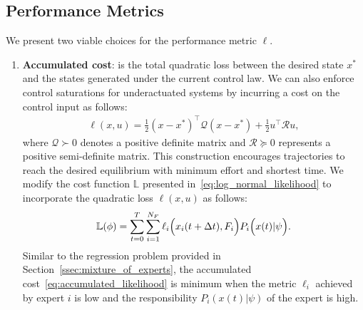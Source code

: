 \subsection{Performance Metrics}
\label{ssec:performance_objective}
%
We present two viable choices for the performance metric $\ell$. 
\begin{enumerate}
    \item \textbf{Accumulated cost}: is the total quadratic loss between the
    desired state $x^*$ and the states generated under the current control law.
    We can also enforce control saturations for underactuated systems by incurring a
    cost on the control input as follows:
    \begin{equation}
        \begin{gathered}
            \ell(x, u) = \frac{1}{2}(x - x^*)^\top \mathcal{Q} (x - x^*) + \frac{1}{2} u^\top \mathcal{R} u , 
        \end{gathered}
    \label{eq:accumulatedLoss}
    \end{equation}
    \noindent where $\mathcal{Q} \succ 0$ denotes a positive definite matrix and
    $\mathcal{R} \succeq 0$ represents a positive semi-definite matrix.
    This construction encourages trajectories to reach the desired equilibrium
    with minimum effort and shortest time.
    We modify the cost function $\mathbb{L}$ presented
    in~\eqref{eq:log_normal_likelihood} to incorporate the quadratic loss
    $\ell(x, u)$ as follows:
    \begin{align}
        \mathbb{L}(\phi) = \sum_{t=0}^{T} \sum_{i=1}^{N_F} \ell_i \Bigl(x_i(t+\Delta t), F_i \Bigr) P_i\Bigl(x(t) | \psi \Bigr)  .
        \label{eq:accumulated_likelihood}
    \end{align}
    Similar to the regression problem provided in
    Section~\ref{ssec:mixture_of_experts}, the accumulated
    cost~\eqref{eq:accumulated_likelihood} is minimum when the metric $\ell_i$
    achieved by expert $i$ is low and the responsibility $P_i(x(t) | \psi)$ of
    the expert is high.


\end{enumerate}
